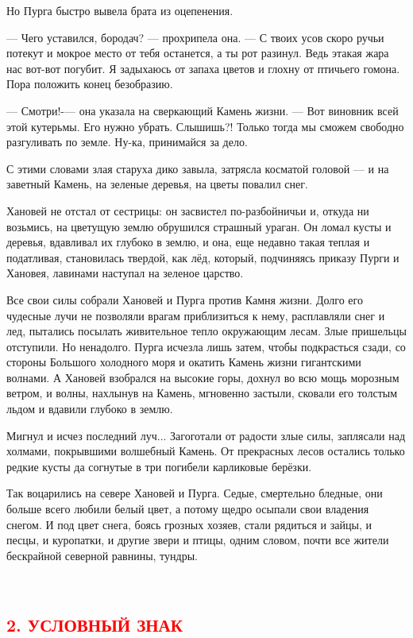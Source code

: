 \documentclass[oneside,final,14pt]{extreport}
\begin{document}
	Но Пурга быстро вывела брата из оцепенения.
	
	— Чего уставился, бородач? — прохрипела она. — С твоих усов скоро ручьи потекут и мокрое место от тебя останется, а ты рот разинул. Ведь этакая жара нас вот-вот погубит. Я задыхаюсь от запаха цветов и глохну от птичьего гомона. Пора положить конец безобразию.
	
	— Смотри!-— она указала на сверкающий Камень жизни. — Вот виновник всей этой кутерьмы. Его нужно убрать. Слышишь?! Только тогда мы сможем свободно разгуливать по земле. Ну-ка, принимайся за дело.
	
	С этими словами злая старуха дико завыла, затрясла косматой головой — и на заветный Камень, на зеленые деревья, на цветы повалил снег.
	
	Хановей не отстал от сестрицы: он засвистел по-разбойничьи и, откуда ни возьмись, на цветущую землю обрушился страшный ураган. Он ломал кусты и деревья, вдавливал их глубоко в землю, и она, еще недавно такая теплая и податливая, становилась твердой, как лёд, который, подчиняясь приказу Пурги и Хановея, лавинами наступал на зеленое царство.
	
	Все свои силы собрали Хановей и Пурга против Камня жизни. Долго его чудесные лучи не позволяли врагам приблизиться к нему, расплавляли снег и лед, пытались посылать живительное тепло окружающим лесам. Злые пришельцы отступили. Но ненадолго. Пурга исчезла лишь затем, чтобы подкрасться сзади, со стороны Большого холодного моря и окатить Камень жизни гигантскими волнами. А Хановей взобрался на высокие горы, дохнул во всю мощь морозным ветром, и волны, нахлынув на Камень, мгновенно застыли, сковали его толстым льдом и вдавили глубоко в землю.
	
	Мигнул и исчез последний луч... Загоготали от радости злые силы, заплясали над холмами, покрывшими волшебный Камень. От прекрасных лесов остались только редкие кусты да согнутые в три погибели карликовые берёзки.
	
	Так воцарились на севере Хановей и Пурга. Седые, смертельно бледные, они больше всего любили белый цвет, а потому щедро осыпали свои владения снегом. И под цвет снега, боясь грозных хозяев, стали рядиться и зайцы, и песцы, и куропатки, и другие звери и птицы, одним словом, почти все жители бескрайной северной равнины, тундры.
	
	\
	{%
		\centering
		\subsection*{\textcolor{red}{2. УСЛОВНЫЙ ЗНАК}}
	}
	
\end{document}
